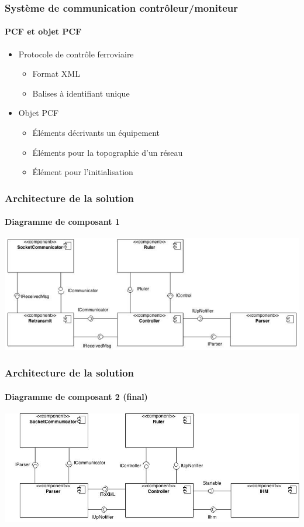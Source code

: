 \begin{frame}
  \frametitle{Système de communication contrôleur/moniteur}
  \framesubtitle{PCF et objet PCF}
  \begin{itemize}
  \item Protocole de contrôle ferroviaire
    \vspace{1em}
    \begin{itemize}
      \item Format XML
        \vspace{1em}
      \item Balises à identifiant unique
        \vspace{1em}
    \end{itemize}
  \item Objet PCF
    \vspace{1em}
    \begin{itemize}
      \item Éléments décrivants un équipement
        \vspace{1em}
      \item Éléments pour la topographie d'un réseau
        \vspace{1em}
      \item Élément pour l'initialisation
        \vspace{1em}
    \end{itemize}
  \end{itemize}
\end{frame}


\begin{frame}
  \frametitle{Architecture de la solution}
  \framesubtitle{Diagramme de composant 1}
  \includegraphics[scale=0.45]{include/diagrammeComposant1.png}
\end{frame}

\begin{frame}
  \frametitle{Architecture de la solution}
  \framesubtitle{Diagramme de composant 2 (final)}
  \includegraphics[scale=0.44]{include/diagrammeComposant2.jpg}
\end{frame}

